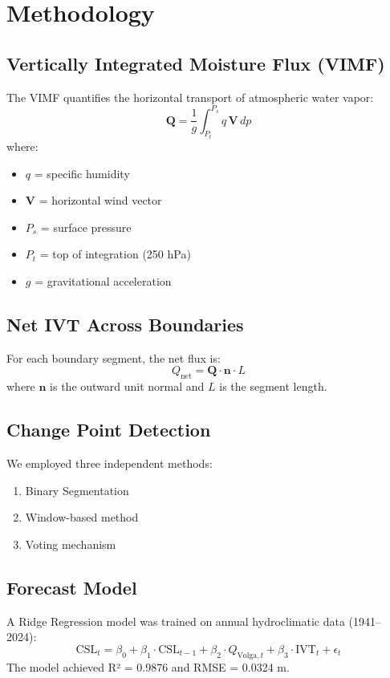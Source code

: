 \documentclass[12pt,a4paper]{article}
\begin{document}
\section{Methodology}

\subsection{Vertically Integrated Moisture Flux (VIMF)}
The VIMF quantifies the horizontal transport of atmospheric water vapor:
\begin{equation}
\mathbf{Q} = \frac{1}{g} \int_{P_t}^{P_s} q \, \mathbf{V} \, dp
\end{equation}
where:
\begin{itemize}
    \item $q$ = specific humidity
    \item $\mathbf{V}$ = horizontal wind vector
    \item $P_s$ = surface pressure
    \item $P_t$ = top of integration (250 hPa)
    \item $g$ = gravitational acceleration
\end{itemize}

\subsection{Net IVT Across Boundaries}
For each boundary segment, the net flux is:
\begin{equation}
Q_{\text{net}} = \mathbf{Q} \cdot \mathbf{n} \cdot L
\end{equation}
where $\mathbf{n}$ is the outward unit normal and $L$ is the segment length.

\subsection{Change Point Detection}
We employed three independent methods:
\begin{enumerate}
    \item Binary Segmentation
    \item Window-based method
    \item Voting mechanism
\end{enumerate}

\subsection{Forecast Model}
A Ridge Regression model was trained on annual hydroclimatic data (1941–2024):
\begin{equation}
\text{CSL}_t = \beta_0 + \beta_1 \cdot \text{CSL}_{t-1} + \beta_2 \cdot Q_{\text{Volga},t} + \beta_3 \cdot \text{IVT}_t + \epsilon_t
\end{equation}
The model achieved R² = 0.9876 and RMSE = 0.0324 m.
\end{document}
